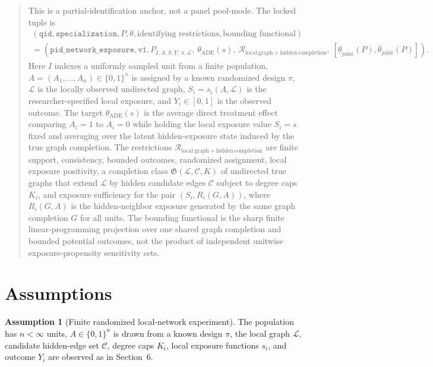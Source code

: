 \documentclass[11pt]{article}
\theoremstyle{definition}
\newtheorem{assumption}{Assumption}
\theoremstyle{plain}
\theoremstyle{remark}
\begin{document}
\begin{quote}\small
This is a partial-identification anchor, not a panel pool-mode.  The locked tuple is
\[
\begin{gathered}
(\texttt{qid},\texttt{specialization},P,\theta,\text{identifying restrictions},
  \text{bounding functional})\\
=
(\texttt{pid\_network\_exposure},\texttt{v1},
  P_{I,A,S,Y;\,\pi,\mathcal L},\ \theta_{\mathrm{ADE}}(s),\
  \mathcal{R}_{\mathrm{local\ graph+hidden\ completion}},\
  [\underline\theta_{\mathrm{joint}}(P),\overline\theta_{\mathrm{joint}}(P)]) .
\end{gathered}
\]
Here \(I\) indexes a uniformly sampled unit from a finite population, \(A=(A_1,\ldots,A_n)\in\{0,1\}^n\) is assigned by a known randomized design \(\pi\), \(\mathcal L\) is the locally observed undirected graph, \(S_i=s_i(A,\mathcal L)\) is the researcher-specified local exposure, and \(Y_i\in[0,1]\) is the observed outcome.  The target \(\theta_{\mathrm{ADE}}(s)\) is the average direct treatment effect comparing \(A_i=1\) to \(A_i=0\) while holding the local exposure value \(S_i=s\) fixed and averaging over the latent hidden-exposure state induced by the true graph completion.  The restrictions \(\mathcal{R}_{\mathrm{local\ graph+hidden\ completion}}\) are finite support, consistency, bounded outcomes, randomized assignment, local exposure positivity, a completion class \(\mathfrak G(\mathcal L,\mathcal C,K)\) of undirected true graphs that extend \(\mathcal L\) by hidden candidate edges \(\mathcal C\) subject to degree caps \(K_i\), and exposure sufficiency for the pair \((S_i,R_i(G,A))\), where \(R_i(G,A)\) is the hidden-neighbor exposure generated by the same graph completion \(G\) for all units.  The bounding functional is the sharp finite linear-programming projection over one shared graph completion and bounded potential outcomes, not the product of independent unitwise exposure-propensity sensitivity sets.
\end{quote}

\section{Assumptions}
\begin{assumption}[Finite randomized local-network experiment]\label{ass:finite-randomized}
The population has \(n<\infty\) units, \(A\in\{0,1\}^n\) is drawn from a known design \(\pi\), the local graph \(\mathcal L\), candidate hidden-edge set \(\mathcal C\), degree caps \(K_i\), local exposure functions \(s_i\), and outcome \(Y_i\) are observed as in Section~6.
\end{assumption}
\end{document}

